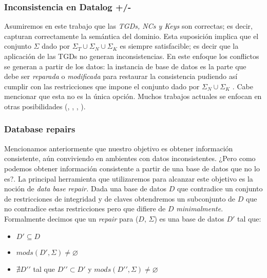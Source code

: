 \documentclass[11pt,a4paper,twoside]{tesis}
\begin{document}
\subsubsection{Inconsistencia en Datalog +/-}

Asumiremos en este trabajo que las \textit{TGDs, NCs y Keys} son correctas; es decir, capturan correctamente la semántica del dominio. Esta suposición implica que el conjunto $\Sigma$  dado por $\Sigma_T \cup \Sigma_N \cup \Sigma_K$  es siempre satisfacible; es decir que la aplicación de las TGDs no generan inconsistencias. En este enfoque los conflictos se generan a partir de los datos: la instancia de base de datos es la parte que debe ser \textit{reparada} o \textit{modificada} para restaurar la consistencia pudiendo así cumplir con las restricciones que impone el conjunto dado por $\Sigma_N \cup \Sigma_K$ . Cabe mencionar que esta no es la única opción. Muchos trabajos actuales se enfocan en otras posibilidades (\cite{Huang}, \cite{Hitzler}, \cite{Parsia}, \cite{Haasa}).

\subsubsection{Database repairs}

Mencionamos anteriormente que nuestro objetivo es obtener información consistente, aún conviviendo en ambientes con datos inconsistentes. ¿Pero como podemos obtener información consistente a partir de una base de datos que no lo es?. La principal herramienta que utilizaremos para alcanzar este objetivo es la noción de \textit{data base repair.} Dada una base de datos $D$ que contradice un conjunto de restricciones de integridad y de claves obtendremos un subconjunto de $D$ que no contradice estas restricciones pero que difiere de $D$ \textit{minimalmente}. Formalmente decimos que un \textit{repair} para ($D$, $\Sigma$) es una base de datos $D\prime$ tal que:
\begin{itemize}
    \item $D\prime \subseteq D$
    \item $mods(D\prime, \Sigma) \neq \varnothing $
    \item $ \nexists D\prime \prime$ tal que $D\prime\prime \subset D\prime$ y $mods(D\prime \prime, \Sigma) \neq \varnothing$
\end{itemize}
\end{document}
